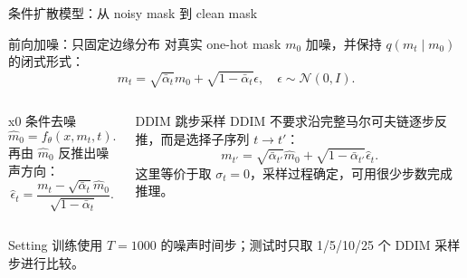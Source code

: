 \documentclass[10pt]{beamer}
\begin{document}
\begin{frame}{条件扩散模型：从 noisy mask 到 clean mask}
  \small
  \begin{block}{前向加噪：只固定边缘分布}
    对真实 one-hot mask $m_0$ 加噪，并保持 $q(m_t\mid m_0)$ 的闭式形式：
    \[
      m_t=\sqrt{\bar{\alpha}_t}m_0+\sqrt{1-\bar{\alpha}_t}\epsilon,\quad
      \epsilon\sim\mathcal{N}(0,I).
    \]
  \end{block}
  \begin{columns}[T]
      \begin{exampleblock}{x0 条件去噪}
        \[
          \hat m_0=f_\theta(x,m_t,t).
        \]
        再由 $\hat m_0$ 反推出噪声方向：
        \[
          \hat\epsilon_t=
          \frac{m_t-\sqrt{\bar\alpha_t}\hat m_0}
          {\sqrt{1-\bar\alpha_t}}.
        \]
      \end{exampleblock}
      \begin{alertblock}{DDIM 跳步采样}
        DDIM 不要求沿完整马尔可夫链逐步反推，而是选择子序列 $t\to t'$：
        \[
          m_{t'}=
          \sqrt{\bar\alpha_{t'}}\hat m_0+
          \sqrt{1-\bar\alpha_{t'}}\hat\epsilon_t.
        \]
        这里等价于取 $\sigma_t=0$，采样过程确定，可用很少步数完成推理。
      \end{alertblock}
  \end{columns}
  \vspace{0.35em}
  \begin{block}{Setting}
    训练使用 $T=1000$ 的噪声时间步；测试时只取 1/5/10/25 个 DDIM 采样步进行比较。
  \end{block}
\end{frame}
\end{document}
